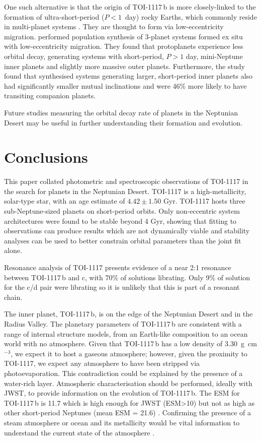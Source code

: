 \documentclass[fleqn,usenatbib,useAMS]{mnras}
\begin{document}
One such alternative is that the origin of TOI-1117\,b is more closely-linked to the formation of ultra-short-period ($P<1$~day) rocky Earths, which commonly reside in multi-planet systems \citep{Sanchis-Ojeda2014}. They are thought to form via low-eccentricity migration. \citet{Pu2019} performed population synthesis of 3-planet systems formed ex situ with low-eccentricity migration. They found that protoplanets experience less orbital decay, generating systems with short-period, $P>1$ day, mini-Neptune inner planets and slightly more massive outer planets. Furthermore, the study found that synthesised systems generating larger, short-period inner planets also had significantly smaller mutual inclinations and were 46\% more likely to have transiting companion planets. 

Future studies measuring the orbital decay rate of planets in the Neptunian Desert may be useful in further understanding their formation and evolution.

\section{Conclusions}
\label{sec:Conclusions}

This paper collated photometric and spectroscopic observations of TOI-1117 in the search for planets in the Neptunian Desert. TOI-1117 is a high-metallicity, solar-type star, with an age estimate of $4.42\pm1.50$ Gyr. TOI-1117 hosts three sub-Neptune-sized planets on short-period orbits. Only non-eccentric system architectures were found to be stable beyond 4 Gyr, showing that fitting to observations can produce results which are not dynamically viable and stability analyses can be used to better constrain orbital parameters than the joint fit alone.

Resonance analysis of TOI-1117 presents evidence of a near 2:1 resonance between TOI-1117\,b and c, with 70\% of solutions librating. Only 9\% of solution for the c/d pair were librating so it is unlikely that this is part of a resonant chain.  
    
The inner planet, TOI-1117\,b, is on the edge of the Neptunian Desert and in the Radius Valley. The planetary parameters of TOI-1117\,b are consistent with a range of internal structure models, from an Earth-like composition to an ocean world with no atmosphere. Given that TOI-1117\,b has a low density of 3.30~g~cm$^{-3}$, we expect it to host a gaseous atmosphere; however, given the proximity to TOI-1117, we expect any atmosphere to have been stripped via photoevaporation. This contradiction could be explained by the presence of a water-rich layer. Atmospheric characterisation should be performed, ideally with JWST, to provide information on the evolution of TOI-1117\,b. The ESM for TOI-1117\,b is 11.7 which is high enough for JWST (ESM>10) but not as high as other short-period Neptunes (mean ESM = 21.6) \citep{Kempton2018}. Confirming the presence of a steam atmosphere or ocean and its metallicity would be vital information to understand the current state of the atmosphere \citep{OwenJackson12:xray-evap}.
\end{document}
